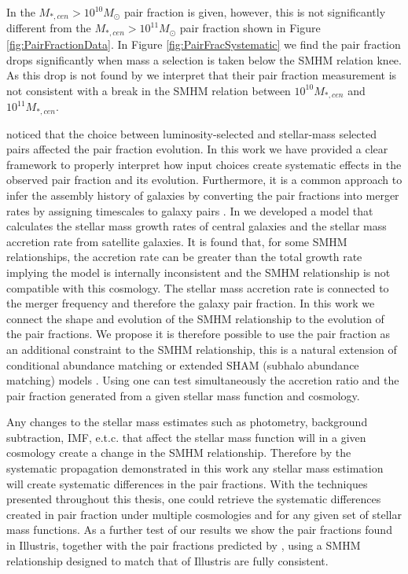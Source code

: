 In \citet{Mundy2017A3.5} the $M_{*,cen} > 10^{10} M_{\odot}$ pair fraction is given, however, this is not significantly different from the $M_{*,cen} > 10^{11} M_{\odot}$ pair fraction shown in Figure \ref{fig:PairFractionData}. In Figure \ref{fig:PairFracSystematic} we find the pair fraction drops significantly when mass a selection is taken below the SMHM relation knee. As this drop is not found by \citet{Mundy2017A3.5} we interpret that their pair fraction measurement is not consistent with a break in the SMHM relation between $10^{10} M_{*,cen}$ and $10^{11} M_{*,cen}$.

\citet{Man2016RESOLVING03} noticed that the choice between luminosity-selected and stellar-mass selected pairs affected the pair fraction evolution. In this work we have provided a clear framework to properly interpret how input choices create systematic effects in the observed pair fraction and its evolution. Furthermore, it is a common approach to infer the assembly history of galaxies by converting the pair fractions into merger rates by assigning timescales to galaxy pairs \citep{Conselice2003A3,Conselice2008TheField,Mundy2017A3.5}. 
In  we developed a model that calculates the stellar mass growth rates of central galaxies and the stellar mass accretion rate from satellite galaxies.
It is found that, for some SMHM relationships, the accretion rate can be greater than the total growth rate implying the model is internally inconsistent and the SMHM relationship is not compatible with this \LCDM cosmology.
The stellar mass accretion rate is connected to the merger frequency and therefore the galaxy pair fraction. 
In this work we connect the shape and evolution of the SMHM relationship to the evolution of the pair fractions.
We propose it is therefore possible to use the pair fraction as an additional constraint to the SMHM relationship, this is a natural extension of conditional abundance matching or extended SHAM (subhalo abundance matching) models \citep{Hearin2013SHAMGroups}.
Using \steel one can test simultaneously the accretion ratio and the pair fraction generated from a given stellar mass function and cosmology.

Any changes to the stellar mass estimates such as photometry, background subtraction, IMF, e.t.c. that affect the stellar mass function will in a given cosmology create a change in the SMHM relationship. Therefore by the systematic propagation demonstrated in this work any stellar mass estimation will create systematic differences in the pair fractions. 
With the techniques presented throughout this thesis, one could retrieve the systematic differences created in pair fraction under multiple \LCDM cosmologies and for any given set of stellar mass functions. As a further test of our results we show the pair fractions found in Illustris, together with the pair fractions predicted by \steel, using a SMHM relationship designed to match
that of Illustris are fully consistent.

